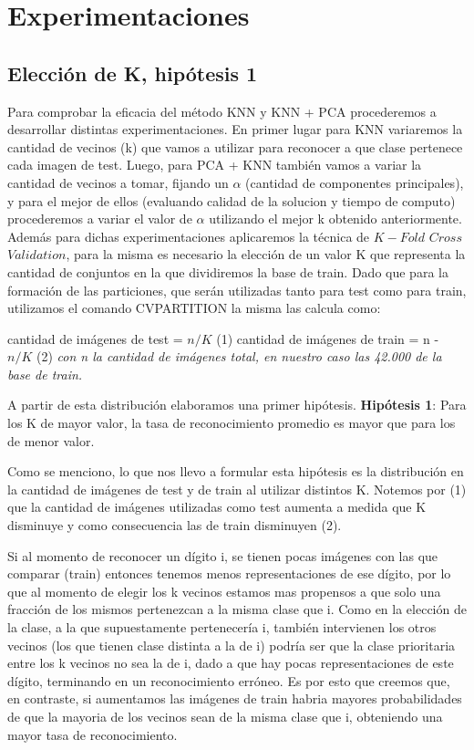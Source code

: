 \newpage
\section{Experimentaciones}

\subsection{Elección de K, hipótesis 1}

Para comprobar la eficacia del método KNN y KNN + PCA procederemos a desarrollar distintas experimentaciones. En primer lugar para KNN variaremos la cantidad de vecinos (k) que vamos a utilizar para reconocer a que clase pertenece cada imagen de test. Luego, para PCA + KNN también vamos a variar la cantidad de vecinos a tomar, fijando un $\alpha$ (cantidad de componentes principales),  y para el mejor de ellos (evaluando calidad de la solucion y tiempo de computo) procederemos a variar el valor de $\alpha$ utilizando el mejor k obtenido  anteriormente.\newline
 Además para dichas experimentaciones aplicaremos la técnica de $K-Fold$ $Cross$ $Validation$, para la misma es necesario la elección de un valor K que representa la cantidad de conjuntos en la que dividiremos la base de train. Dado que para la formación de las particiones, que serán utilizadas tanto para test como para train, utilizamos el comando CVPARTITION la misma las calcula como:\newline
 
 cantidad de imágenes de test = $n/K$  (1)\newline
  cantidad de imágenes de train = n - $n/K$ (2)\newline
  \textit{con n la cantidad de imágenes total, en nuestro caso las 42.000 de la base de train.}
  
A partir de esta distribución elaboramos una primer hipótesis. 
 \textbf{Hipótesis 1}: Para los K de mayor valor, la tasa de reconocimiento promedio es mayor que para los de menor valor.  
 
 Como se menciono, lo que nos llevo a formular esta hipótesis es la distribución en la cantidad de imágenes de test y de train al utilizar distintos K. Notemos por (1) que la cantidad de imágenes utilizadas como test aumenta a medida que K disminuye y como consecuencia las de train disminuyen (2). 
 
Si al momento de reconocer un dígito i, se tienen pocas imágenes con las que comparar (train) entonces tenemos menos representaciones de ese dígito, por lo que al momento de elegir los k vecinos estamos mas propensos a que solo una fracción de los mismos pertenezcan a la misma clase que i. Como en la elección de la clase, a la que supuestamente pertenecería i, también intervienen los otros vecinos (los que tienen clase distinta a la de i) podría ser que la clase prioritaria entre los k vecinos no sea la de i, dado a que hay pocas representaciones de este dígito, terminando en un reconocimiento erróneo. Es por esto que creemos que, en contraste, si aumentamos las imágenes de train habria mayores probabilidades de que la mayoria de los vecinos sean de la misma clase que i, obteniendo una mayor tasa de reconocimiento. 

